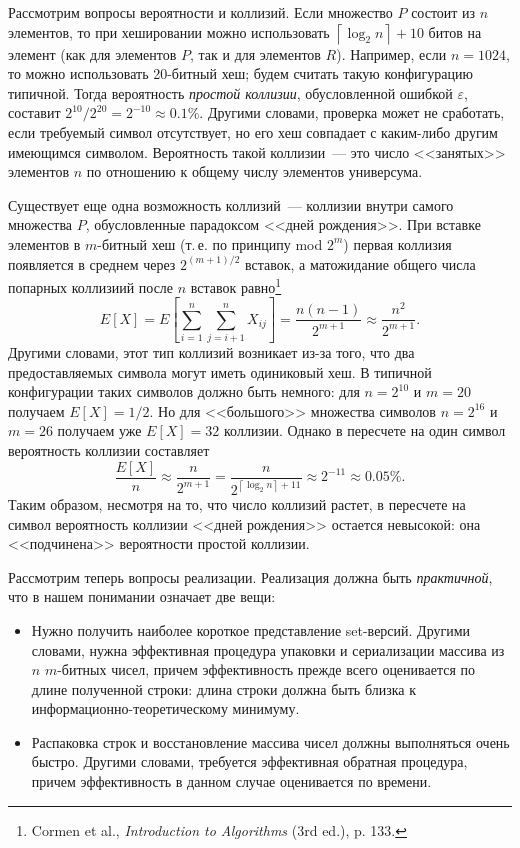 \documentclass[russian,a4paper,12pt,titlepage]{article}
\begin{document}
Рассмотрим вопросы вероятности и коллизий.  Если множество $P$ состоит из $n$ элементов,
то при хешировании можно использовать $\left\lceil\log_2n\right\rceil+10$ битов на элемент
(как для элементов $P$, так и для элементов $R$).  Например, если $n=1024$, то можно использовать 20-битный хеш;
будем считать такую конфигурацию типичной.  Тогда вероятность \emph{простой коллизии}, обусловленной ошибкой $\varepsilon$,
составит $2^{10}/2^{20}=2^{-10}\approx0.1\%$.  Другими словами, проверка может не сработать, если требуемый символ
отсутствует, но его хеш совпадает с каким-либо другим имеющимся символом.  Вероятность такой коллизии~--- это
число <<занятых>> элементов $n$ по отношению к общему числу элементов универсума.

Существует еще одна возможность коллизий~--- коллизии внутри самого множества $P$, обусловленные парадоксом
<<дней рождения>>.  При вставке элементов в $m$-битный хеш (т.\,е. по принципу mod $2^m$) первая коллизия
появляется в среднем через $2^{(m+1)/2}$ вставок, а матожидание общего числа попарных коллизиий
после $n$ вставок равно\footnote{Cormen et al., \emph{Introduction to Algorithms} (3rd ed.), p. 133.}
$$E[X]=E\left[\sum_{i=1}^n\sum_{j=i+1}^n{X_{ij}}\right]=\frac{n(n-1)}{2^{m+1}}\approx\frac{n^2}{2^{m+1}}.$$
Другими словами, этот тип коллизий возникает из-за того, что два предоставляемых символа могут иметь
одиниковый хеш.  В типичной конфигурации таких символов должно быть немного: для $n=2^{10}$ и $m=20$ получаем
$E[X]=1/2$.  Но для <<большого>> множества символов $n=2^{16}$ и $m=26$ получаем уже $E[X]=32$ коллизии.
Однако в пересчете на один символ вероятность коллизии составляет
$$\frac{E[X]}{n}\approx\frac{n}{2^{m+1}}=\frac{n}{2^{ \left\lceil\log_2n\right\rceil+11 }}\approx2^{-11}\approx0.05\%.$$
Таким образом, несмотря на то, что число коллизий растет, в пересчете на символ вероятность коллизии <<дней рождения>>
остается невысокой: она <<подчинена>> вероятности простой коллизии.

Рассмотрим теперь вопросы реализации.  Реализация должна быть \emph{практичной},
что в нашем понимании означает две вещи:
\begin{itemize}
\item Нужно получить наиболее короткое представление set-версий.  Другими словами, нужна эффективная процедура
упаковки и сериализации массива из $n$ $m$-битных чисел, причем эффективность прежде всего оценивается по длине
полученной строки: длина строки должна быть близка к информационно-теоретическому минимуму.
\item Распаковка строк и восстановление массива чисел должны выполняться очень быстро.  Другими словами,
требуется эффективная обратная процедура, причем эффективность в данном случае оценивается по времени.
\end{itemize}
\end{document}
